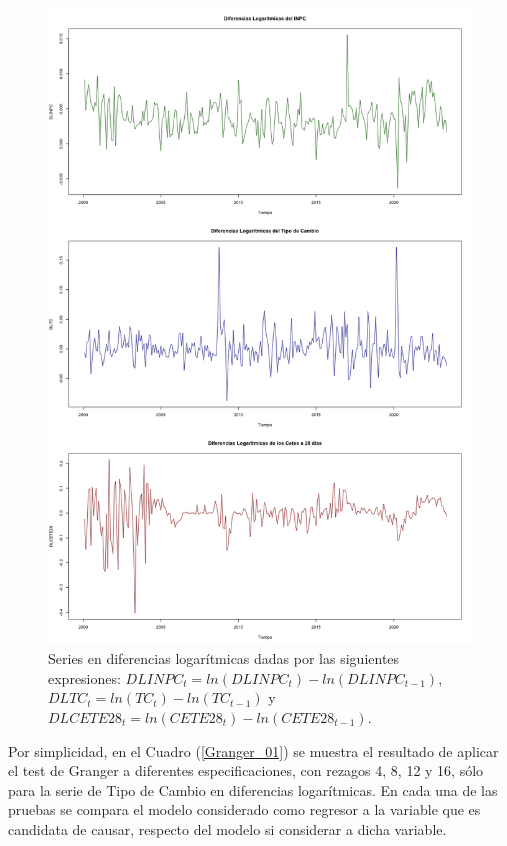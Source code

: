 \documentclass[
  a4paper,
]{article}
\begin{document}
\begin{figure}
  \centering
    \includegraphics[width = 1.0 \textwidth]{DLGranger}
    \caption{Series en diferencias logarítmicas dadas por las siguientes expresiones: $DLINPC_t = ln(DLINPC_t) - ln(DLINPC_{t-1})$, $DLTC_t = ln(TC_t) - ln(TC_{t-1})$ y $DLCETE28_t = ln(CETE28_t) - ln(CETE28_{t-1})$.}
  \label{DLGranger}
\end{figure}

Por simplicidad, en el Cuadro (\ref{Granger_01}) se muestra el resultado
de aplicar el test de Granger a diferentes especificaciones, con rezagos
4, 8, 12 y 16, sólo para la serie de Tipo de Cambio en diferencias
logarítmicas. En cada una de las pruebas se compara el modelo
considerado como regresor a la variable que es candidata de causar,
respecto del modelo si considerar a dicha variable.
\end{document}
